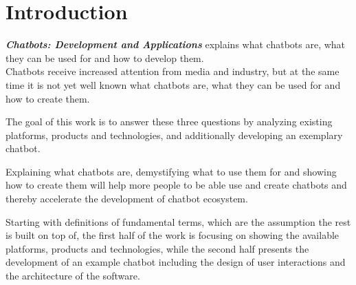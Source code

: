 \chapter{Introduction}

\emph{\textbf{Chatbots: Development and Applications}} explains what chatbots are, what they can be used for and how to develop them.
\\

Chatbots receive increased attention from media and industry,
but at the same time it is not yet well known what chatbots are, what they can be used for and how to create them.

The goal of this work is to answer these three questions by analyzing existing platforms, products and technologies,
and additionally developing an exemplary chatbot.

Explaining what chatbots are, demystifying what to use them for and showing how to create them
will help more people to be able use and create chatbots and thereby accelerate the development of chatbot ecosystem.

Starting with definitions of fundamental terms, which are the assumption the rest is built on top of,
the first half of the work is focusing on showing the available platforms, products and technologies,
while the second half presents the development of an example chatbot including the design of user interactions and the architecture of the software.
